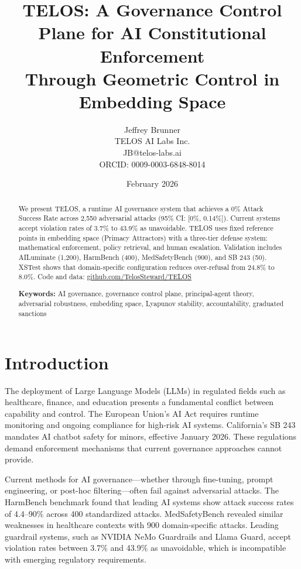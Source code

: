 \documentclass[11pt,twocolumn]{article}
\title{TELOS: A Governance Control Plane for AI Constitutional Enforcement\\Through Geometric Control in Embedding Space}
\author{Jeffrey Brunner\\TELOS AI Labs Inc.\\JB@telos-labs.ai\\ORCID: 0009-0003-6848-8014}
\date{February 2026}
\begin{document}
\maketitle

\begin{abstract}
We present TELOS, a runtime AI governance system that achieves a 0\% Attack Success Rate across 2,550 adversarial attacks (95\% CI: [0\%, 0.14\%]). Current systems accept violation rates of 3.7\% to 43.9\% as unavoidable. TELOS uses fixed reference points in embedding space (Primacy Attractors) with a three-tier defense system: mathematical enforcement, policy retrieval, and human escalation. Validation includes AILuminate (1,200), HarmBench (400), MedSafetyBench (900), and SB 243 (50). XSTest shows that domain-specific configuration reduces over-refusal from 24.8\% to 8.0\%. Code and data: \url{github.com/TelosSteward/TELOS}

\textbf{Keywords:} AI governance, governance control plane, principal-agent theory, adversarial robustness, embedding space, Lyapunov stability, accountability, graduated sanctions
\end{abstract}

\section{Introduction}

The deployment of Large Language Models (LLMs) in regulated fields such as healthcare, finance, and education presents a fundamental conflict between capability and control. The European Union's AI Act requires runtime monitoring and ongoing compliance for high-risk AI systems. California's SB 243 mandates AI chatbot safety for minors, effective January 2026. These regulations demand enforcement mechanisms that current governance approaches cannot provide.

Current methods for AI governance---whether through fine-tuning, prompt engineering, or post-hoc filtering---often fail against adversarial attacks. The HarmBench benchmark found that leading AI systems show attack success rates of 4.4--90\% across 400 standardized attacks. MedSafetyBench revealed similar weaknesses in healthcare contexts with 900 domain-specific attacks. Leading guardrail systems, such as NVIDIA NeMo Guardrails and Llama Guard, accept violation rates between 3.7\% and 43.9\% as unavoidable, which is incompatible with emerging regulatory requirements.
\end{document}
